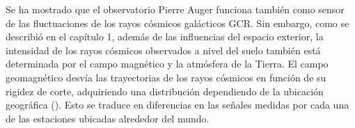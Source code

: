 Se ha mostrado que el observatorio Pierre Auger funciona también como sensor de las fluctuaciones de los rayos cósmicos galácticos GCR. Sin embargo, como se describió en el capítulo 1, además de las influencias del espacio exterior, la intensidad de los rayos cósmicos observados a nivel del suelo también está determinada por el campo magnético y la atmósfera de la Tierra.  El campo geomagnético desvía las trayectorias de los rayos cósmicos en función de su rigidez de corte, adquiriendo una distribución dependiendo de la ubicación geográfica (\cite{herbst_2013influence}). Esto se traduce en diferencias en las señales medidas por cada una de las estaciones ubicadas alrededor del mundo. 


